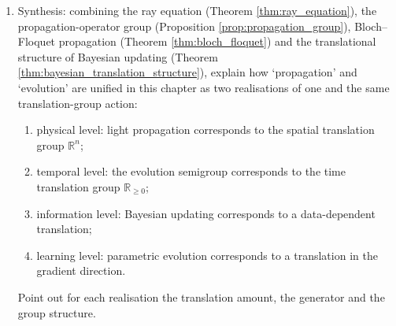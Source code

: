 \begin{enumerate}[leftmargin=3em, label=\textbf{Exercise \arabic*}]
    \item Synthesis: combining the ray equation (Theorem \ref{thm:ray_equation}),
    the propagation-operator group (Proposition \ref{prop:propagation_group}),
    Bloch--Floquet propagation (Theorem \ref{thm:bloch_floquet})
    and the translational structure of Bayesian updating (Theorem \ref{thm:bayesian_translation_structure}),
    explain how `propagation' and `evolution' are unified in this chapter as two realisations of one and the same translation-group action:
    \begin{enumerate}[label=(\roman*)]
        \item physical level: light propagation corresponds to the spatial translation group $\mathbb{R}^n$;
        \item temporal level: the evolution semigroup corresponds to the time translation group $\mathbb{R}_{\ge0}$;
        \item information level: Bayesian updating corresponds to a data-dependent translation;
        \item learning level: parametric evolution corresponds to a translation in the gradient direction.
    \end{enumerate}
    Point out for each realisation the translation amount, the generator and the group structure.
\end{enumerate}
